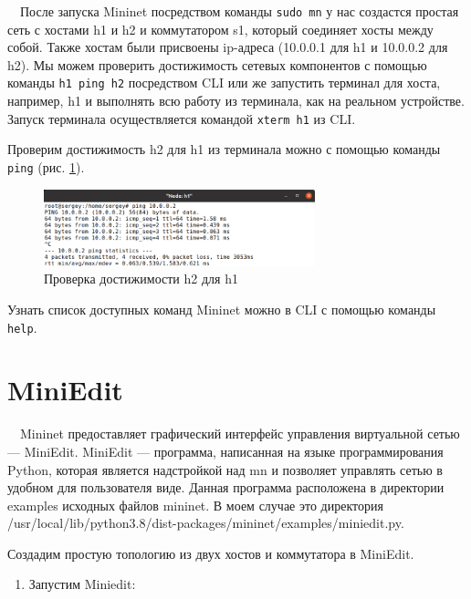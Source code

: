 \documentclass[
  13pt,
  fontsize=13pt,
  russian,
  a4paper,
,captions=tableheading
]{scrreprt}
\providecommand{\tightlist}{%
  \setlength{\itemsep}{0pt}\setlength{\parskip}{0pt}}
\begin{document}
\(\quad\)После запуска Mininet посредством команды
\texttt{sudo mn} у нас создастся простая сеть с хостами h1 и
h2 и коммутатором s1, который соединяет хосты между собой. Также хостам
были присвоены ip-адреса (10.0.0.1 для h1 и 10.0.0.2 для h2). Мы можем
проверить достижимость сетевых компонентов с помощью команды
\texttt{h1 ping h2} посредством CLI или же запустить терминал
для хоста, например, h1 и выполнять всю работу из терминала, как на
реальном устройстве. Запуск терминала осуществляется командой
\texttt{xterm h1} из CLI.

Проверим достижимость h2 для h1 из терминала можно с помощью команды
\texttt{ping} (рис. \ref{fig:0002}).

\begin{figure}
\hypertarget{fig:0002}{%
\centering
\includegraphics[width=0.7\textwidth,height=\textheight]{mininet_2.2.png}
\caption{Проверка достижимости h2 для h1}\label{fig:0002}
}
\end{figure}

Узнать список доступных команд Mininet можно в CLI с помощью команды
\texttt{help}.

\hypertarget{miniedit}{%
\section{MiniEdit}\label{miniedit}}

\(\quad\)Mininet предоставляет графический интерфейс управления
виртуальной сетью --- MiniEdit. MiniEdit --- программа, написанная на
языке программирования Python, которая является надстройкой над mn и
позволяет управлять сетью в удобном для пользователя виде. Данная
программа расположена в директории examples исходных файлов mininet. В
моем случае это директория
/usr/local/lib/python3.8/dist-packages/mininet/examples/miniedit.py.

Создадим простую топологию из двух хостов и коммутатора в MiniEdit.

\begin{enumerate}
\def\labelenumi{\arabic{enumi}.}
\tightlist
\item
  Запустим Miniedit:
\end{enumerate}
\end{document}
